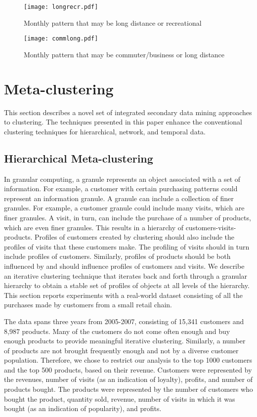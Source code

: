 \documentclass[oribibl]{llncs}
\begin{document}
\begin{figure}
\centerline{\texttt{[image: longrecr.pdf]}}
\caption{Monthly pattern that may be
long distance or recreational}
\label{longrecr}
\end{figure}

\begin{figure}
\centerline{\texttt{[image: commlong.pdf]}}
\caption{Monthly pattern that may be commuter/business or long distance}
\label{commlong}
\end{figure}

\section{Meta-clustering}
This section describes a novel set of integrated secondary data mining approaches to clustering. The techniques presented in this paper enhance the conventional clustering techniques for hierarchical, network, and temporal data.

\subsection{Hierarchical Meta-clustering} 
In granular computing, a granule represents an object associated with a set of information. For example, a customer with certain purchasing patterns could represent an information granule. A granule can include a collection of finer granules. For example, a customer granule could include many visits, which are finer granules. A visit, in turn, can include the purchase of a number of products, which are even finer granules. This results in a hierarchy of customers-visits-products. Profiles of customers created by clustering should also include the profiles of visits that these customers make. The profiling of visits should in turn include profiles of customers. Similarly, profiles of products should be both influenced by and should influence profiles of customers and visits. We describe an iterative clustering technique that iterates back and forth through a granular hierarchy to obtain a stable set of profiles of objects at all levels of the hierarchy. This section reports experiments with a real-world dataset
consisting of all the purchases made by customers
from a small retail chain.

The data spans three years from 2005-2007,
consisting of 15,341 customers and 8,987 products.
Many of the customers do not come often enough and
buy enough products to provide meaningful iterative
clustering.
Similarly, a number of products are not brought frequently
enough and not by a diverse customer population.
Therefore, we chose to restrict our analysis to the top
1000 customers and the top 500 products, based on their
revenue.
Customers were represented by the revenues, number of visits (as an indication of loyalty),
profits, and number of products bought.
The products were represented by the number of customers who bought
the product, quantity sold, revenue, number of visits in which it was bought
(as an indication of popularity), and profits.
\end{document}
